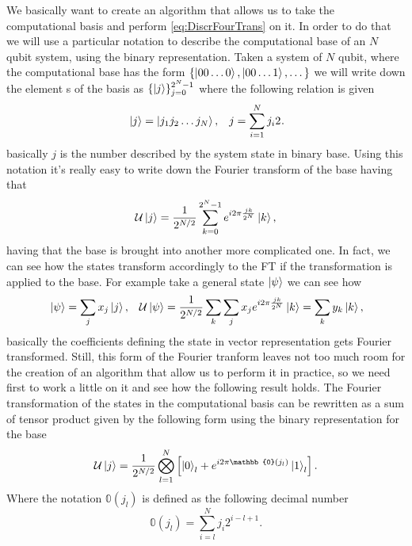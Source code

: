 We basically want to create an algorithm that allows us to take the computational basis and perform \eqref{eq:DiscrFourTrans} on it. In order to do that we will use a particular notation to describe the computational base of an $N$ qubit system, using the binary representation.
{
    Taken a system of $N$ qubit, where the computational base has the form $\{\ket{00\dots 0}, \ket{00\dots 1}, \dots\}$ we will write down the element s of the basis as $\{\ket{j}\}_{j=0}^{2^N-1}$ where the following relation is given
    \begin{align}
        &\ket{j} = \ket{j_1j_2\dots j_N}, &j = \sum_{i=1}^N j_i 2^{}.
    \end{align}
    basically $j$ is the number described by the system state in binary base.
}
\noindent
Using this notation it's really easy to write down the Fourier transform of the base having that
\begin{equation}
    \label{eq:QFT}
    \mathcal{U}\ket{j} = \frac{1}{2^{N/2}} \sum_{k=0}^{2^N-1} e^{i2\pi \frac{jk}{2^N}} \ket{k},
\end{equation}
having that the base is brought into another more complicated one. In fact, we can see how the states transform accordingly to the FT if the transformation is applied to the base. For example take a general state $\ket{\psi}$ we can see how
\begin{align}
    &\ket{\psi} = \sum_j x_j \ket{j}, &\mathcal{U}\ket{\psi} = \frac{1}{2^{N/2}} \sum_k\sum_j x_j e^{i2\pi \frac{jk}{2^N}} \ket{k} = \sum_k y_k\ket{k},
\end{align}
basically the coefficients defining the state in vector representation gets Fourier transformed. Still, this form of the Fourier tranform leaves not too much room for the creation of an algorithm that allow us to perform it in practice, so we need first to work a little on it and see how the following result holds.
{
    The Fourier transformation of the states in the computational basis can be rewritten as a sum of tensor product given by the following form using the binary representation for the base
    \begin{equation}
        \mathcal{U}\ket{j} = \frac{1}{2^{N/2}}\bigotimes_{l=1}^N\left[ \ket{0}_l + e^{i2\pi \mathbb{0}(j_l)}\ket{1}_l \right].
    \end{equation}
    Where the notation $\mathbb{0}(j_l)$ is defined as the following decimal number
    \begin{equation}
        \mathbb{0}(j_l) = \sum_{i=l}^N j_i2^{i-l+1}. 
    \end{equation}
}
